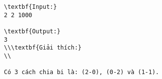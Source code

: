 \begin{verbatim}
\textbf{Input:}
2 2 1000

\textbf{Output:}
3
\\\textbf{Giải thích:}
\\

Có 3 cách chia bi là: (2-0), (0-2) và (1-1).\end{verbatim}